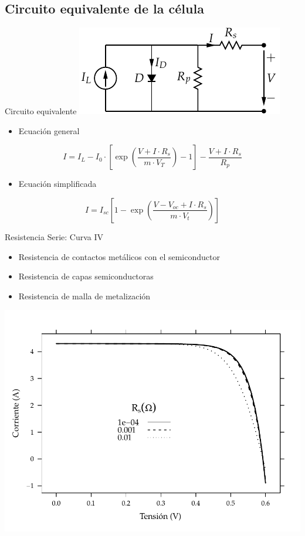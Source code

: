 \documentclass[xcolor={usenames,svgnames,dvipsnames}]{beamer}
\begin{document}
\subsection{Circuito equivalente de la célula}
\label{sec-3-3}

\begin{frame}[label=sec-3-3-1]{Circuito equivalente}
\includegraphics[width=.9\linewidth]{../figs/ModeloElectricoCelulaSolar.pdf}

\begin{itemize}
\item Ecuación general
\end{itemize}

\[I=I_{L}-I_{0}\cdot[\exp(\frac{V+I\cdot R_{s}}{m\cdot
  V_{T}})-1]-\frac{V+I\cdot R_{s}}{R_{p}}\]

\begin{itemize}
\item Ecuación simplificada
\end{itemize}

$$I=I_{sc}[1-\exp(\frac{V-V_{oc}+I\cdot R_{s}}{m\cdot V_{t}})]$$
\end{frame}

\begin{frame}[label=sec-3-3-2]{Resistencia Serie: Curva IV}
\begin{itemize}
\item Resistencia de contactos metálicos con el semiconductor

\item Resistencia de capas semiconductoras

\item Resistencia de malla de metalización
\end{itemize}

\includegraphics[width=.9\linewidth]{../figs/InfluenciaRs_IV.pdf}
\end{frame}
\end{document}

